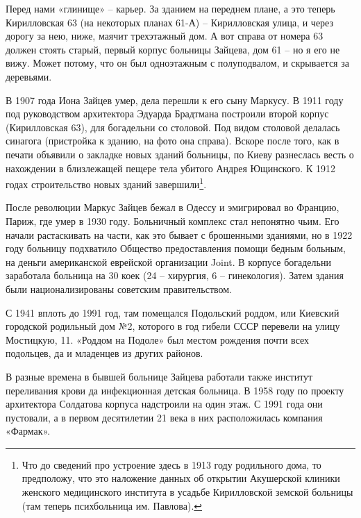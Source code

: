 Перед нами «глинище» – карьер. За зданием на переднем плане, а это теперь Кирилловская 63 (на некоторых планах 61-А) – Кирилловская улица, и через дорогу за нею, ниже, маячит трехэтажный дом. А вот справа от номера 63 должен стоять старый, первый корпус больницы Зайцева, дом 61 – но я его не вижу. Может потому, что он был одноэтажным с полуподвалом, и скрывается за деревьями. 

В 1907 года Иона Зайцев умер, дела перешли к его сыну Маркусу. В 1911 году под руководством архитектора Эдуарда Брадтмана построили второй корпус (Кирилловская 63), для богадельни со столовой. Под видом столовой делалась синагога (пристройка к зданию, на фото она справа). Вскоре после того, как в печати объявили о закладке новых зданий больницы, по Киеву разнеслась весть о нахождении в близлежащей пещере тела убитого Андрея Ющинского. К 1912 годах строительство новых зданий завершили\footnote{Что до сведений про устроение здесь в 1913 году родильного дома, то предположу, что это наложение данных об открытии Акушерской клиники женского медицинского института в усадьбе Кирилловской земской больницы (там теперь психбольница им. Павлова).}. 


После революции Маркус Зайцев бежал в Одессу и эмигрировал во Францию, Париж, где умер в 1930 году. Больничный комплекс стал непонятно чьим. Его начали растаскивать на части, как это бывает с брошенными зданиями, но в 1922 году  больницу подхватило Общество предоставления помощи бедным больным, на деньги американской еврейской организации Joint. В корпусе богадельни заработала больница на 30 коек (24 – хирургия, 6 – гинекология). Затем здания были национализированы советским правительством.

С 1941 вплоть до 1991 год, там помещался Подольский роддом, или Киевский городской родильный дом №2, которого в год гибели СССР перевели на улицу Мостицкую, 11. «Роддом на Подоле» был местом рождения почти всех подольцев, да и младенцев из других районов. 

В разные времена в бывшей больнице Зайцева работали также институт переливания крови да инфекционная детская больница. В 1958 году по проекту архитектора Солдатова корпуса надстроили на один этаж. С 1991 года они пустовали, а в первом десятилетии 21 века в них расположилась компания «Фармак». 

